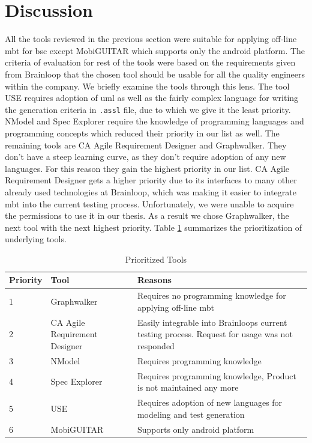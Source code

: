 \section{Discussion}

\par
All the tools reviewed in the previous section were suitable for applying off-line \acrshort{mbt} for \acrshort{bsc} except MobiGUITAR which supports only the android platform. The criteria of evaluation for rest of the tools were based on the requirements given from Brainloop that the chosen tool should be usable for all the quality engineers within the company. We briefly examine the tools through this lens. The tool USE requires adoption of \acrshort{uml} as well as the fairly complex language for writing the generation criteria in \texttt{.assl} file, due to which we give it the least priority. NModel and Spec Explorer require the knowledge of programming languages and programming concepts which reduced their priority in our list as well. The remaining tools are CA Agile Requirement Designer and Graphwalker. They don't have a steep learning curve, as they don't require adoption of any new languages. For this reason they gain the highest priority in our list. CA Agile Requirement Designer gets a higher priority due to its interfaces to many other already used technologies at Brainloop, which was making it easier to integrate \acrshort{mbt} into the current testing process. Unfortunately, we were unable to acquire the permissions to use it in our thesis. As a result we chose Graphwalker, the next tool with the next highest priority. Table \ref{tab:Prioritized_Tools} summarizes the prioritization of underlying tools.

\begin{table}[]
    \centering
    \begin{tabular}{|l|l|p{8cm}|}
        \hline
        Priority & Tool & Reasons \\
        \hline
        1 & Graphwalker & Requires no programming knowledge for applying off-line \acrshort{mbt} \\
        \hline
        2 & CA Agile Requirement Designer & Easily integrable into Brainloops current testing process. Request for usage was not responded \\
        \hline
        3 & NModel & Requires programming knowledge \\
        \hline
        4 & Spec Explorer & Requires programming knowledge, Product is not maintained any more \\
        \hline
        5 & USE & Requires adoption of new languages for modeling and test generation\\
        \hline
        6 & MobiGUITAR & Supports only android platform \\
        \hline
    \end{tabular}
    \caption{Prioritized Tools}
    \label{tab:Prioritized_Tools}
\end{table}